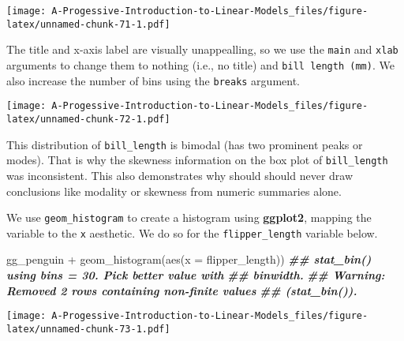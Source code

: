 \documentclass[
]{book}
\newenvironment{Shaded}{\begin{snugshade}}{\end{snugshade}}
\newcommand{\AttributeTok}[1]{\textcolor[rgb]{0.77,0.63,0.00}{#1}}
\newcommand{\DecValTok}[1]{\textcolor[rgb]{0.00,0.00,0.81}{#1}}
\newcommand{\DocumentationTok}[1]{\textcolor[rgb]{0.56,0.35,0.01}{\textbf{\textit{#1}}}}
\newcommand{\FunctionTok}[1]{\textcolor[rgb]{0.00,0.00,0.00}{#1}}
\newcommand{\NormalTok}[1]{#1}
\newcommand{\SpecialCharTok}[1]{\textcolor[rgb]{0.00,0.00,0.00}{#1}}
\newcommand{\StringTok}[1]{\textcolor[rgb]{0.31,0.60,0.02}{#1}}
\theoremstyle{definition}
\theoremstyle{definition}
\theoremstyle{definition}
\theoremstyle{definition}
\theoremstyle{remark}
\begin{document}
\texttt{[image: A-Progessive-Introduction-to-Linear-Models\_files/figure-latex/unnamed-chunk-71-1.pdf]}

The title and x-axis label are visually unappealling, so we use the \texttt{main} and \texttt{xlab} arguments to change them to nothing (i.e., no title) and \texttt{bill\ length\ (mm)}. We also increase the number of bins using the \texttt{breaks} argument.

\begin{Shaded}
\end{Shaded}

\texttt{[image: A-Progessive-Introduction-to-Linear-Models\_files/figure-latex/unnamed-chunk-72-1.pdf]}

This distribution of \texttt{bill\_length} is bimodal (has two prominent peaks or modes). That is why the skewness information on the box plot of \texttt{bill\_length} was inconsistent. This also demonstrates why should should never draw conclusions like modality or skewness from numeric summaries alone.

We use \texttt{geom\_histogram} to create a histogram using \textbf{ggplot2}, mapping the variable to the \texttt{x} aesthetic. We do so for the \texttt{flipper\_length} variable below.

\begin{Shaded}
\begin{Highlighting}[]
\NormalTok{gg\_penguin }\SpecialCharTok{+} \FunctionTok{geom\_histogram}\NormalTok{(}\FunctionTok{aes}\NormalTok{(}\AttributeTok{x =}\NormalTok{ flipper\_length))}
\DocumentationTok{\#\# \textasciigrave{}stat\_bin()\textasciigrave{} using \textasciigrave{}bins = 30\textasciigrave{}. Pick better value with}
\DocumentationTok{\#\# \textasciigrave{}binwidth\textasciigrave{}.}
\DocumentationTok{\#\# Warning: Removed 2 rows containing non{-}finite values}
\DocumentationTok{\#\# (\textasciigrave{}stat\_bin()\textasciigrave{}).}
\end{Highlighting}
\end{Shaded}

\texttt{[image: A-Progessive-Introduction-to-Linear-Models\_files/figure-latex/unnamed-chunk-73-1.pdf]}
\end{document}
